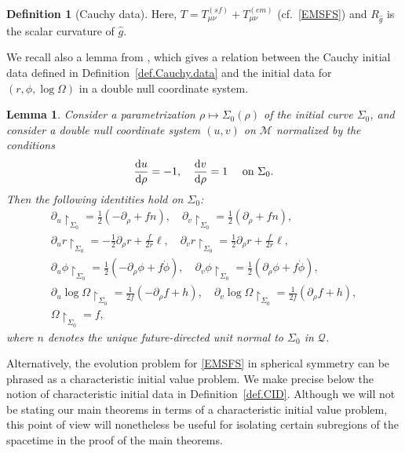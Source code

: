 \documentclass[10pt, reqno]{amsart}
\newtheorem{lemma}[theorem]{Lemma}
\theoremstyle{definition}
\newtheorem{definition}[theorem]{Definition}
\theoremstyle{remark}
\theoremstyle{conjecture}
\numberwithin{equation}{section}
\newcommand{\ud}{\mathrm{d}}
\newcommand{\rd}{\partial}
\newcommand{\0}{\emptyset}
\newcommand{\Sgm}{\Sigma}
\newcommand{\Omg}{\Omega}
\newcommand{\calM}{\mathcal M}
\begin{document}
\begin{definition}[Cauchy data]
Here, $T = T^{(sf)}_{\mu\nu}+T^{(em)}_{\mu\nu}$ (cf.~\eqref{EMSFS}) and $R_{\hat{g}}$ is the scalar curvature of $\hat{g}$.
\end{definition}

We recall also a lemma from \cite{LO.interior}, which gives a relation between the Cauchy initial data defined in Definition~\ref{def.Cauchy.data} and the initial data for $(r, \phi, \log \Omg)$ in a double null coordinate system.
\begin{lemma} \label{lem:cauchy-to-char}
Consider a parametrization $\rho \mapsto \Sgm_{0}(\rho)$ of the initial curve $\Sgm_{0}$, and consider a double null coordinate system $(u, v)$ on $\calM$ normalized by the conditions
\begin{equation*}
\frac{\ud u}{\ud \rho} = -1, \quad 
\frac{\ud v}{\ud \rho} = 1 \quad \hbox{ on } \Sgm_{0}.
\end{equation*}
Then the following identities hold on $\Sgm_{0}$: 
\begin{gather*}
	\rd_{u} \restriction_{\Sgm_{0}} = \frac{1}{2} (-\rd_{\rho} + f n), \quad 
	\rd_{v} \restriction_{\Sgm_{0}} = \frac{1}{2} (\rd_{\rho} + f n), \\
	\rd_{u} r \restriction_{\Sgm_{0}} = - \frac{1}{2} \rd_{\rho} r + \frac{f}{2 r} \ell, \quad
	\rd_{v} r \restriction_{\Sgm_{0}} = \frac{1}{2} \rd_{\rho} r + \frac{f}{2 r} \ell, \\
	\rd_{u} \phi \restriction_{\Sgm_{0}} = \frac{1}{2} ( - \rd_{\rho} \phi + f \dot{\phi}), \quad
	\rd_{v} \phi \restriction_{\Sgm_{0}} = \frac{1}{2} ( \rd_{\rho} \phi + f \dot{\phi}), \\
	\rd_{u} \log \Omg \restriction_{\Sgm_{0}} = \frac{1}{2f} (- \rd_{\rho} f + h), \quad
	\rd_{v} \log \Omg \restriction_{\Sgm_{0}} = \frac{1}{2f} (\rd_{\rho} f + h),\\
	\Omg \restriction_{\Sgm_{0}}=f,
\end{gather*}
where $n$ denotes the unique future-directed unit normal to $\Sgm_0$ in $\mathcal Q$.
\end{lemma}


Alternatively, the evolution problem for \eqref{EMSFS} in spherical symmetry can be phrased as a characteristic initial value problem. We make precise below the notion of characteristic initial data in Definition~\ref{def.CID}. Although we will not be stating our main theorems in terms of a characteristic initial value problem, this point of view will nonetheless be useful for isolating certain subregions of the spacetime in the proof of the main theorems. 
\end{document}
